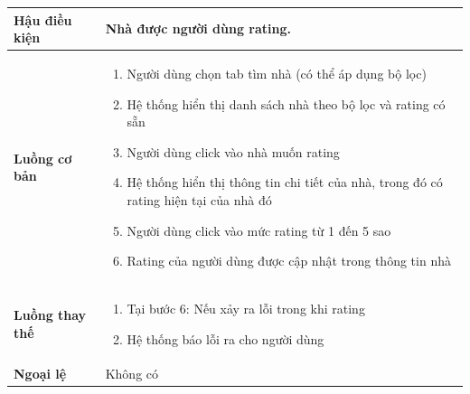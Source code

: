 \begin{enumerate}[label=\textbf{(\alph*)}]
\begin{center}
\begin{longtable}{ | l |p{10cm}|}
			\textbf{Hậu điều kiện} &  Nhà được người dùng rating. \\ \hline 
			\textbf{Luồng cơ bản} & 
			\begin{enumerate}
		\item Người dùng chọn tab tìm nhà (có thể áp dụng bộ lọc)
        \item Hệ thống hiển thị danh sách nhà theo bộ lọc và rating có sẵn
        \item Người dùng click vào nhà muốn rating
        \item Hệ thống hiển thị thông tin chi tiết của nhà, trong đó có rating hiện tại của nhà đó
        \item Người dùng click vào mức rating từ 1 đến 5 sao
        \item Rating của người dùng được cập nhật trong thông tin nhà
			\end{enumerate} \\ \hline 
			\textbf{Luồng thay thế} &
				\begin{enumerate}
    				\item Tại bước 6: Nếu xảy ra lỗi trong khi rating
    				\item Hệ thống báo lỗi ra cho người dùng
    			\end{enumerate} \\ \hline
			\textbf{Ngoại lệ}  & Không có \\
			\hline
		\end{longtable}
	\end{center}
\end{enumerate}